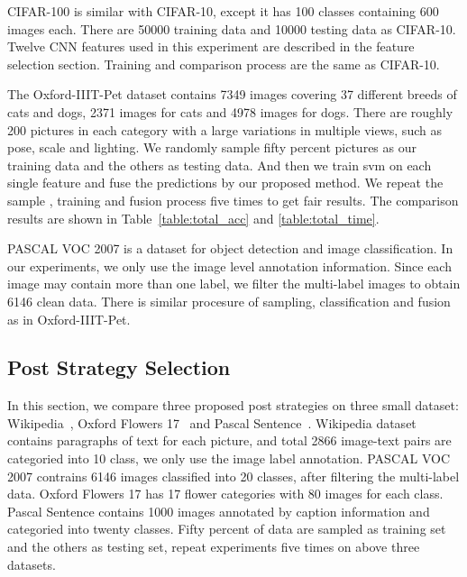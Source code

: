 \documentclass[letterpaper]{article}
\begin{document}

CIFAR-100 is similar with CIFAR-10, except it has 100 classes containing 600 images each.
There are 50000 training data and 10000 testing data as CIFAR-10. 
Twelve CNN features used in this experiment are described in the feature selection section. 
Training and comparison process are the same as CIFAR-10.




The Oxford-IIIT-Pet dataset contains 7349 images covering 37 different breeds of cats and dogs, 2371 images for cats and 4978 images for dogs. 
There are roughly 200 pictures in each category with a large variations in multiple views, such as pose, scale and lighting.
We randomly sample fifty percent pictures as our training data and the others as testing data.
And then we train svm on each single feature and fuse the predictions by our proposed method.
We repeat the sample , training and fusion process five times to get fair results.
The comparison results are shown in Table~\ref{table:total_acc} and \ref{table:total_time}.

PASCAL VOC 2007 is a dataset for object detection and image classification.
In our experiments, we only use the image level annotation information.
Since each image may contain more than one label, we filter the multi-label images to obtain 6146 clean data.
There is similar procesure of sampling, classification and fusion as in Oxford-IIIT-Pet.



\subsection{Post Strategy Selection}

In this section, we compare three proposed post strategies on three small dataset: Wikipedia~\cite{rasiwasia2010new}, Oxford Flowers 17~\cite{nilsback2006visual} and Pascal Sentence~\cite{Li2006One}.
Wikipedia dataset contains paragraphs of text for each picture,
and total 2866 image-text pairs are categoried into 10 class, we only use the image label annotation.
PASCAL VOC 2007 contrains 6146 images classified into 20 classes, after filtering the multi-label data. 
Oxford Flowers 17 has 17 flower categories with 80 images for each class. 
Pascal Sentence contains 1000 images annotated by caption information and categoried into twenty classes.
Fifty percent of data are sampled as training set and the others as testing set, repeat experiments five times on above three datasets.
\end{document}
